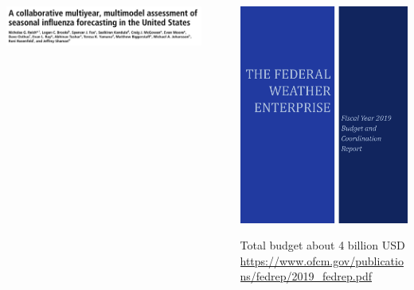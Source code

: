 \documentclass[aspectratio=169]{beamer}
\begin{document}
\begin{frame}

\begin{columns}

\begin{column}{0.5\textwidth}
\begin{center}
\includegraphics[width = 0.9\textwidth]{figures/reich_collaborative_2019_title}
\end{center}
\end{column}

\pause

\begin{column}{0.5\textwidth}
\begin{center}
\includegraphics[height = 0.8\textheight]{figures/federal_weather_2019}
\end{center}
\vfill
Total budget about 4 billion USD\\
\url{https://www.ofcm.gov/publications/fedrep/2019\_fedrep.pdf}
\end{column}
\end{columns}

\end{frame}
\end{document}
